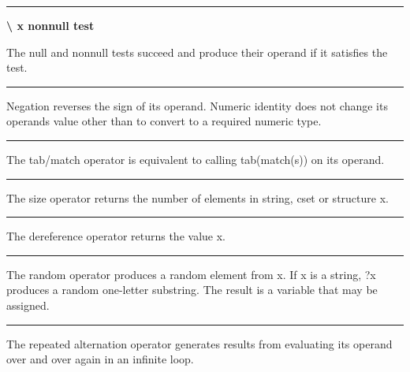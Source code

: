 \bigskip\hrule\vspace{0.1cm}

\noindent
{\bf {\textbackslash} x \hfill nonnull test}

\noindent
The null and nonnull tests succeed
and produce their operand if it satisfies the test.

\bigskip\hrule\vspace{0.1cm}


\noindent
Negation reverses the sign of its operand. Numeric identity does not
change its operand{\textquotesingle}s value other than to convert to a
required numeric type.

\bigskip\hrule\vspace{0.1cm}

\noindent
{}The tab/match operator is equivalent to calling
\textsf{tab(match(s))} on its operand.

\bigskip\hrule\vspace{0.1cm}

\noindent
The size operator returns the number of elements in
string, cset or structure \textsf{x}.

\bigskip\hrule\vspace{0.1cm}

\noindent
The dereference operator returns the value
\textsf{x}.

\bigskip\hrule\vspace{0.1cm}

\noindent
The random operator produces a random element
from \textsf{x}. If \textsf{x} is a string, \textsf{?x} produces a
random one-letter substring. The result is a variable that may be
assigned.

\bigskip\hrule\vspace{0.1cm}

\noindent
The repeated alternation operator generates
results from evaluating its operand over and over again in an infinite
loop.

